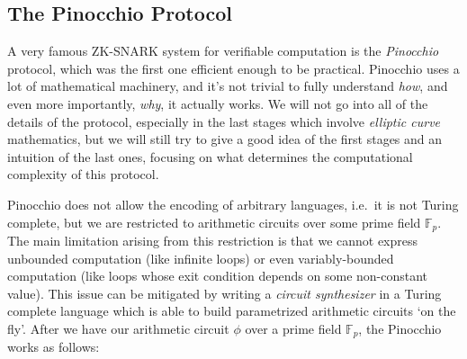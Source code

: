 \subsection{The Pinocchio Protocol}
A very famous ZK-SNARK system for verifiable computation is the \emph{Pinocchio} protocol,
which was the first one efficient enough to be practical.
Pinocchio uses a lot of mathematical machinery, and it's not trivial to fully understand
\emph{how}, and even more importantly, \emph{why}, it actually works.
We will not go into all of the details of the protocol, especially in the last stages which involve
\emph{elliptic curve} mathematics, but we will still try to give a good idea of the first stages
and an intuition of the last ones, focusing on what determines the computational complexity of
this protocol.

Pinocchio does not allow the encoding of arbitrary languages, i.e.\ it is not Turing complete, but
we are restricted to arithmetic circuits over some prime field \(\mathbb{F}_p\).
The main limitation arising from this restriction is that we cannot express unbounded computation
(like infinite loops) or even variably-bounded computation (like loops whose exit condition
depends on some non-constant value).
This issue can be mitigated by writing a \emph{circuit synthesizer} in a Turing complete language
which is able to build parametrized arithmetic circuits `on the fly'.
After we have our arithmetic circuit \(\phi \) over a prime field \(\mathbb{F}_p\), the Pinocchio
works as follows:

